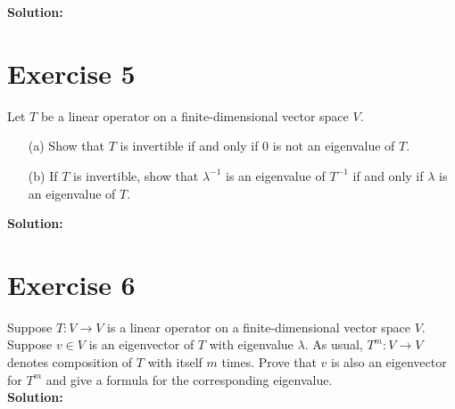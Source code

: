 \documentclass{article}
\begin{document}
\textbf{Solution:} \\



\newpage

\section*{Exercise 5}
Let $T$ be a linear operator on a finite-dimensional vector space $V$.

\begin{enumerate}
    \item[(a)] Show that $T$ is invertible if and only if $0$ is not an eigenvalue of $T$.

    \item[(b)] If $T$ is invertible, show that $\lambda^{-1}$ is an eigenvalue of $T^{-1}$ if and only if $\lambda$ is an eigenvalue of $T$.
\end{enumerate}

\textbf{Solution:} \\



\newpage

\section*{Exercise 6}
Suppose $T : V \rightarrow V$ is a linear operator on a finite-dimensional vector space $V$. Suppose $v \in V$ is an eigenvector of $T$ with eigenvalue $\lambda$. As usual, $T^m : V \rightarrow V$ denotes composition of $T$ with itself $m$ times. Prove that $v$ is also an eigenvector for $T^m$ and give a formula for the corresponding eigenvalue. \\

\textbf{Solution:} \\



\newpage
\end{document}
